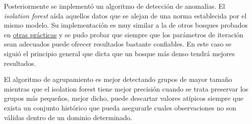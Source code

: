\documentclass[12pt,a4paper,table]{article}
\begin{document}
Posteriormente se implementó un algoritmo de detección de anomalías. El
\emph{isolation forest} aísla aquellos datos que se alejan de una norma
establecida por el mismo modelo. Su implementación es muy similar a la
de otros bosques probados en
\href{https://gitlab.com/genomorro/unir/-/blob/AA-A1}{otras prácticas} y
se pudo probar que siempre que los parámetros de iteración sean
adecuados puede ofrecer resultados bastante confiables. En este caso se
siguió el principio general que dicta que un bosque más denso tendrá
mejores resultados.

El algoritmo de agrupamiento es mejor detectando grupos de mayor tamaño
mientras que el isolation forest tiene mejor precisión cuando se trata
preservar los grupos más pequeños, mejor dicho, puede descartar valores
atípicos siempre que exista un conjunto histórico que pueda asegurarle
cuales observaciones no son válidas dentro de un dominio determinado.


    
        
    
    
\end{document}
